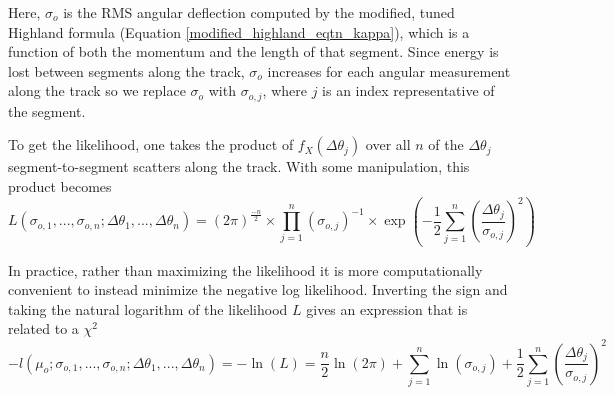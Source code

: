 \documentclass[a4paper,11pt]{article}
\begin{document}
Here, $\sigma_o$ is the RMS angular deflection computed by the modified, tuned Highland formula (Equation \ref{modified_highland_eqtn_kappa}), which is a function of both the momentum and the length of that segment. Since energy is lost between segments along the track, $\sigma_o$ increases for each angular measurement along the track so we replace $\sigma_o$ with $\sigma_{o,j}$, where $j$ is an index representative of the segment. \newline

To get the likelihood, one takes the product of $f_X(\Delta\theta_j)$ over all $n$ of the $\Delta\theta_j$ segment-to-segment scatters along the track. With some manipulation, this product becomes
\begin{equation}
L(\sigma_{o,1},...,\sigma_{o,n};\Delta\theta_1,...,\Delta\theta_n) = (2\pi)^\frac{-n}{2}\times\prod_{j=1}^{n}(\sigma_{o,j})^{-1} \times \exp(-\frac{1}{2}\sum_{j=1}^{n}(\frac{\Delta\theta_j}{\sigma_{o,j}})^2)
\end{equation}

In practice, rather than maximizing the likelihood it is more computationally convenient to instead minimize the negative log likelihood. Inverting the sign and taking the natural logarithm of the likelihood $L$ gives an expression that is related to a $\chi^2$
\begin{equation}\label{leo_llhd_eqtn}
-l(\mu_o;\sigma_{o,1},...,\sigma_{o,n};\Delta\theta_1,...,\Delta\theta_n) = -\ln(L) = \frac{n}{2}\ln(2\pi) + \sum_{j=1}^{n}\ln(\sigma_{o,j}) + \frac{1}{2}\sum_{j=1}^{n}(\frac{\Delta\theta_j}{\sigma_{o,j}})^2
\end{equation}


\end{document}
